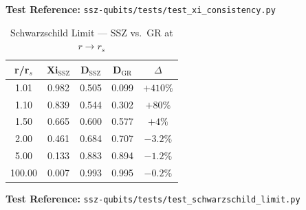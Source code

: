 \textbf{Test Reference:} \texttt{ssz-qubits/tests/test\_xi\_consistency.py}

\begin{table}[h]
\centering
\caption{Schwarzschild Limit — SSZ vs.\ GR at $r \to r_s$}
\label{tab:schwarzschild-limit}
\begin{tabular}{|c|c|c|c|c|}
\hline
\textbf{r/r$_s$} & \textbf{Xi$_{\text{SSZ}}$} & \textbf{D$_{\text{SSZ}}$} & \textbf{D$_{\text{GR}}$} & \textbf{$\Delta$} \\
\hline
1.01 & 0.982 & 0.505 & 0.099 & $+410\%$ \\
1.10 & 0.839 & 0.544 & 0.302 & $+80\%$ \\
1.50 & 0.665 & 0.600 & 0.577 & $+4\%$ \\
2.00 & 0.461 & 0.684 & 0.707 & $-3.2\%$ \\
5.00 & 0.133 & 0.883 & 0.894 & $-1.2\%$ \\
100.00 & 0.007 & 0.993 & 0.995 & $-0.2\%$ \\
\hline
\end{tabular}
\end{table}

\textbf{Test Reference:} \texttt{ssz-qubits/tests/test\_schwarzschild\_limit.py}

